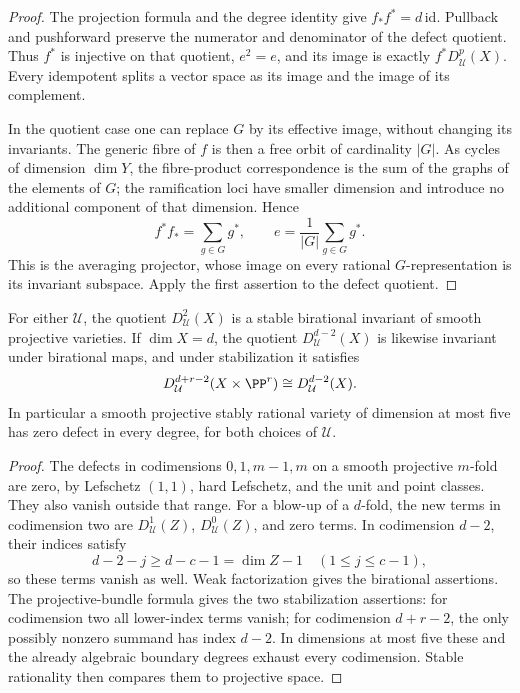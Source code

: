 \begin{proof}
The projection formula and the degree identity give
\(f_*f^*=d\,\mathrm{id}\). Pullback and pushforward preserve
the numerator and denominator of the defect quotient. Thus
\(f^*\) is injective on that quotient, \(e^2=e\), and its image
is exactly \(f^*D_{\mathcal U}^p(X)\). Every idempotent splits
a vector space as its image and the image of its complement.

In the quotient case one can replace \(G\) by its effective
image, without changing its invariants. The generic fibre of
\(f\) is then a free orbit of cardinality \(|G|\). As cycles
of dimension \(\dim Y\), the fibre-product correspondence is
the sum of the graphs of the elements of \(G\); the ramification
loci have smaller dimension and introduce no additional
component of that dimension. Hence
\[
 f^*f_* = \sum_{g\in G}g^*,\qquad
 e=\frac1{|G|}\sum_{g\in G}g^*.
\]
This is the averaging projector, whose image on every rational
\(G\)-representation is its invariant subspace. Apply the
first assertion to the defect quotient.
\end{proof}

\begin{corollary}
\label{v7:cor:stable-defect}
For either \(\mathcal U\), the quotient
\(D_{\mathcal U}^2(X)\) is a stable birational invariant of
smooth projective varieties. If \(\dim X=d\), the quotient
\(D_{\mathcal U}^{d-2}(X)\) is likewise invariant under
birational maps, and under stabilization it satisfies
\[
 D_{\mathcal U}^{d+r-2}(X\times\PP^r)
     \cong D_{\mathcal U}^{d-2}(X).
\]
In particular a smooth projective stably rational variety of
dimension at most five has zero defect in every degree, for
both choices of \(\mathcal U\).
\end{corollary}

\begin{proof}
The defects in codimensions \(0,1,m-1,m\) on a smooth
projective \(m\)-fold are zero, by Lefschetz \((1,1)\),
hard Lefschetz, and the unit and point classes. They also vanish
outside that range. For a blow-up of a \(d\)-fold, the new
terms in codimension two are \(D_{\mathcal U}^1(Z)\),
\(D_{\mathcal U}^0(Z)\), and zero terms. In codimension
\(d-2\), their indices satisfy
\[
 d-2-j\ge d-c-1=\dim Z-1
 \quad(1\le j\le c-1),
\]
so these terms vanish as well. Weak factorization
\cite{AKMW02} gives the birational assertions. The
projective-bundle formula gives the two stabilization
assertions: for codimension two all lower-index terms vanish;
for codimension \(d+r-2\), the only possibly nonzero summand
has index \(d-2\). In dimensions at most five these and the
already algebraic boundary degrees exhaust every codimension.
Stable rationality then compares them to projective space.
\end{proof}

